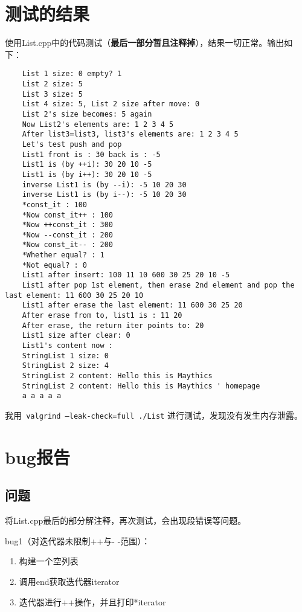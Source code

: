 \documentclass[UTF8]{ctexart}
\begin{document}
\section{测试的结果}

使用List.cpp中的代码测试（\textbf{最后一部分暂且注释掉}），结果一切正常。输出如下：

\begin{verbatim}
    List 1 size: 0 empty? 1
    List 2 size: 5
    List 3 size: 5
    List 4 size: 5, List 2 size after move: 0
    List 2's size becomes: 5 again
    Now List2's elements are: 1 2 3 4 5
    After list3=list3, list3's elements are: 1 2 3 4 5
    Let's test push and pop
    List1 front is : 30 back is : -5
    List1 is (by ++i): 30 20 10 -5
    List1 is (by i++): 30 20 10 -5
    inverse List1 is (by --i): -5 10 20 30
    inverse List1 is (by i--): -5 10 20 30
    *const_it : 100
    *Now const_it++ : 100
    *Now ++const_it : 300
    *Now --const_it : 200
    *Now const_it-- : 200
    *Whether equal? : 1
    *Not equal? : 0
    List1 after insert: 100 11 10 600 30 25 20 10 -5
    List1 after pop 1st element, then erase 2nd element and pop the last element: 11 600 30 25 20 10
    List1 after erase the last element: 11 600 30 25 20
    After erase from to, list1 is : 11 20
    After erase, the return iter points to: 20
    List1 size after clear: 0
    List1's content now :
    StringList 1 size: 0
    StringList 2 size: 4
    StringList 2 content: Hello this is Maythics
    StringList 2 content: Hello this is Maythics ' homepage
    a a a a a
\end{verbatim}

我用\texttt{ valgrind --leak-check=full  ./List} 进行测试，发现没有发生内存泄露。

\section{bug报告}

\subsection{问题}

将List.cpp最后的部分解注释，再次测试，会出现段错误等问题。\

bug1（对迭代器未限制++与- -范围）：\

\begin{enumerate}
    \item 构建一个空列表
    \item 调用end获取迭代器iterator
    \item 迭代器进行++操作，并且打印*iterator
\end{enumerate}
\end{document}

